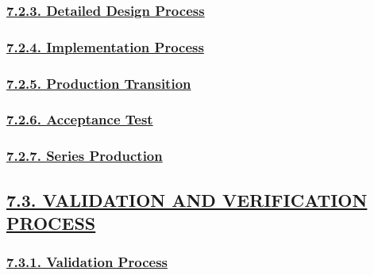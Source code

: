 \documentclass[
]{article}
\begin{document}
\hypertarget{detailed-design-process}{%
\subsubsection{\texorpdfstring{\protect\hyperlink{detailed-design-process-1}{7.2.3.
Detailed Design
Process}}{7.2.3. Detailed Design Process}}\label{detailed-design-process}}

\hypertarget{implementation-process}{%
\subsubsection{\texorpdfstring{\protect\hyperlink{implementation-process-1}{7.2.4.
Implementation
Process}}{7.2.4. Implementation Process}}\label{implementation-process}}

\hypertarget{production-transition}{%
\subsubsection{\texorpdfstring{\protect\hyperlink{production-transition-1}{7.2.5.
Production
Transition}}{7.2.5. Production Transition}}\label{production-transition}}

\hypertarget{acceptance-test}{%
\subsubsection{\texorpdfstring{\protect\hyperlink{acceptance-test-1}{7.2.6.
Acceptance Test}}{7.2.6. Acceptance Test}}\label{acceptance-test}}

\hypertarget{series-production}{%
\subsubsection{\texorpdfstring{\protect\hyperlink{series-production-1}{7.2.7.
Series Production}}{7.2.7. Series Production}}\label{series-production}}

\hypertarget{validation-and-verification-process}{%
\subsection{\texorpdfstring{\protect\hyperlink{validation-and-verification-process-1}{7.3.
VALIDATION AND VERIFICATION
PROCESS}}{7.3. VALIDATION AND VERIFICATION PROCESS}}\label{validation-and-verification-process}}

\hypertarget{validation-process}{%
\subsubsection{\texorpdfstring{\protect\hyperlink{validation-process-1}{7.3.1.
Validation
Process}}{7.3.1. Validation Process}}\label{validation-process}}
\end{document}
